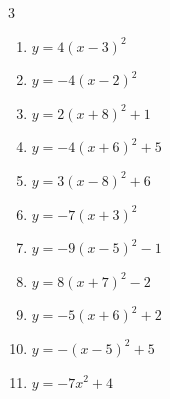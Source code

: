 \begin{multicols}{3}
\begin{enumerate}
        \phantom{$\displaystyle 頂点\left( -5 , -5 \right)$}

  \item $\displaystyle y=4\left( x-3\right)^{2}$

        \phantom{$\displaystyle 頂点\left( 3 , 0 \right)$}

  \item $\displaystyle y=-4\left( x-2\right)^{2}$

        \phantom{$\displaystyle 頂点\left( 2 , 0 \right)$}

  \item $\displaystyle y=2\left( x+8\right)^{2}+1$

        \phantom{$\displaystyle 頂点\left( -8 , 1 \right)$}

  \item $\displaystyle y=-4\left( x+6\right)^{2}+5$

        \phantom{$\displaystyle 頂点\left( -6 , 5 \right)$}

  \item $\displaystyle y=3\left( x-8\right)^{2}+6$

        \phantom{$\displaystyle 頂点\left( 8 , 6 \right)$}

  \item $\displaystyle y=-7\left( x+3\right)^{2}$

        \phantom{$\displaystyle 頂点\left( -3 , 0 \right)$}

  \item $\displaystyle y=-9\left( x-5\right)^{2}-1$

        \phantom{$\displaystyle 頂点\left( 5 , -1 \right)$}

  \item $\displaystyle y=8\left( x+7\right)^{2}-2$

        \phantom{$\displaystyle 頂点\left( -7 , -2 \right)$}

  \item $\displaystyle y=-5\left( x+6\right)^{2}+2$

        \phantom{$\displaystyle 頂点\left( -6 , 2 \right)$}

  \item $\displaystyle y=-\left( x-5\right)^{2}+5$

        \phantom{$\displaystyle 頂点\left( 5 , 5 \right)$}

\columnbreak %

  \item $\displaystyle y=-7x^{2}+4$


\end{enumerate}
\end{multicols}
